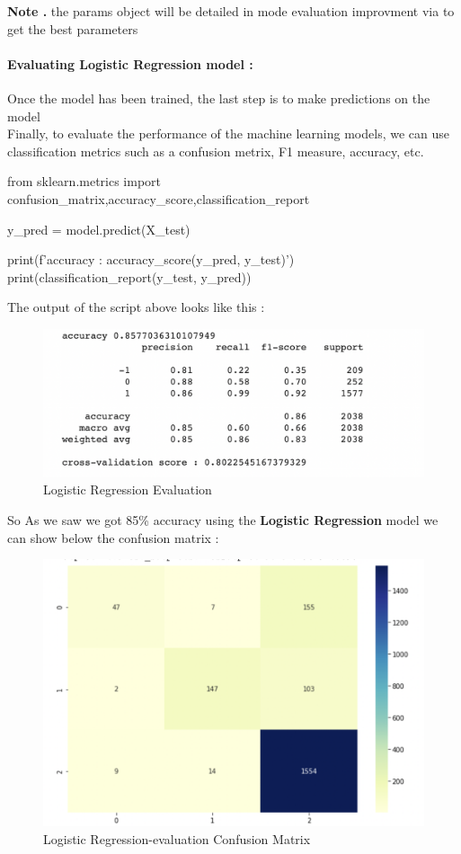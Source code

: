 \documentclass{article}
\begin{document}
\textbf{Note .} the params object will be detailed in mode evaluation improvment via  to get the best parameters

\paragraph{ Evaluating Logistic Regression model :}
Once the model has been trained, the last step is to make predictions on the model \\
Finally, to evaluate the performance of the machine learning models, we can use classification metrics such as a confusion metrix, F1 measure, accuracy, etc.
\begin{code}
from sklearn.metrics import confusion_matrix,accuracy_score,classification_report

y_pred = model.predict(X_test)

print(f'accuracy : {accuracy_score(y_pred, y_test)}')
print(classification_report(y_test, y_pred))

\end{code}
The output of the script above looks like this :
\begin{figure}[H]
    \centering
    \includegraphics[scale=0.55]{src/img/log_reg_acc.png}
    \caption{Logistic Regression Evaluation}
    \label{fig:my_label}
\end{figure}
So As we saw we got 85\% accuracy using the \textbf{Logistic Regression} model we can show below the confusion matrix :
\begin{figure}[H]
    \centering
    \includegraphics[scale=0.4]{src/img/log_reg_cm.png}
    \caption{Logistic Regression-evaluation Confusion Matrix}
    \label{fig:my_label}
\end{figure}
\end{document}
